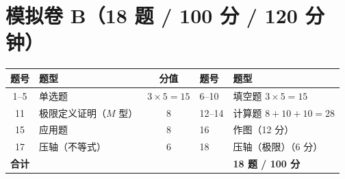 \newpage
\section{模拟卷 B（18 题 / 100 分 / 120 分钟）}

\begin{center}
\small\setlength{\tabcolsep}{5pt}
\begin{tabularx}{\linewidth}{c l c l X@{}}
\toprule
题号 & 题型 & 分值 & 题号 & 题型\\
\midrule
1--5 & 单选题 & $3\times5=15$ & 6--10 & 填空题 $3\times5=15$\\
11 & 极限定义证明（$M$ 型）& 8 & 12--14 & 计算题 $8+10+10=28$\\
15 & 应用题 & 8 & 16 & 作图（12 分）\\
17 & 压轴（不等式） & 6 & 18 & 压轴（极限）（6 分）\\
\midrule
\multicolumn{4}{l}{\textbf{合计}} & \textbf{18 题 / 100 分}\\
\bottomrule
\end{tabularx}
\end{center}

